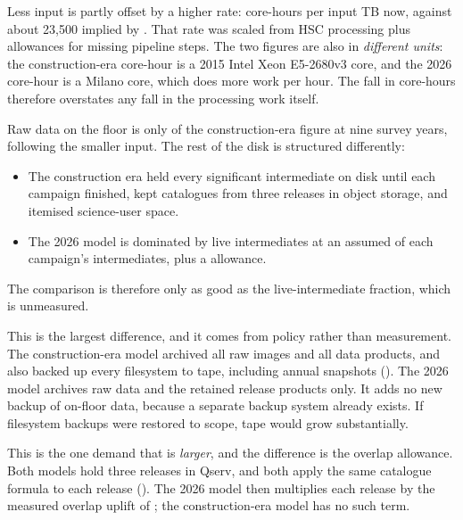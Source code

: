 Less input is partly offset by a higher rate: \smChPerTB{} core-hours per input
TB now, against about 23{,}500 implied by . That
rate was scaled from HSC processing plus allowances for missing pipeline steps.
The two figures are also in \emph{different units}: the construction-era
core-hour is a 2015 Intel Xeon E5-2680v3 core, and the 2026 core-hour is a
Milano core, which does more work per hour. The fall in core-hours therefore
overstates any fall in the processing work itself.

Raw data on the floor is only \smCmpRawNine{} of the construction-era figure
at nine survey years, following the smaller input. The rest of the disk is structured
differently:
\begin{itemize}
\item The construction era held every significant intermediate on disk until
      each campaign finished, kept catalogues from three releases in object
      storage, and itemised science-user space.
\item The 2026 model is dominated by live intermediates at an assumed
      \smLiveFrac{} of each campaign's intermediates, plus a
      \smOtherFrac{} allowance.
\end{itemize}
The comparison is therefore only as good as the live-intermediate fraction,
which is unmeasured.

This is the largest difference, and it comes from policy rather than
measurement. The construction-era model archived all raw images and all data
products, and also backed up every filesystem to tape, including annual
snapshots (). The 2026 model archives raw data and the
retained release products only. It adds no new backup of on-floor data,
because a separate backup system already exists. If filesystem backups were
restored to scope, tape would grow substantially.

This is the one demand that is \emph{larger}, and the difference is the
overlap allowance. Both models hold three releases in Qserv, and both apply
the same catalogue formula to each release (). The
2026 model then multiplies each release by the measured overlap uplift of
\smQsOverlap{}; the construction-era model has no such term.

